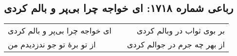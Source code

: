 \begin{center}
\section*{رباعی شماره ۱۷۱۸: ای خواجه چرا بی‌پر و بالم کردی}
\label{sec:1718}
\begin{longtable}{l p{0.5cm} r}
ای خواجه چرا بی‌پر و بالم کردی
&&
بر بوی ثواب در وبالم کردی
\\
از تو برهٔ تو جو ندزدیدم من
&&
از بهر چه جرم در جوالم کردی
\\
\end{longtable}
\end{center}
